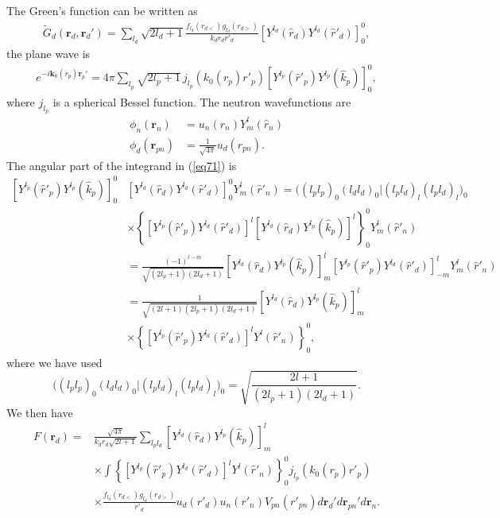\documentclass[a4paper,11pt]{article}
\begin{document}
The Green's function can be written as
\begin{align}\label{eq44}
\widetilde G_d(\mathbf r_d,\mathbf r_d')=\sum_{l_d}\sqrt{2l_d+1}\frac{f_{l_d}(r_{d<})g_{l_d}(r_{d>})}{k_dr_dr'_d}\left[Y^{l_d}(\hat r_d) Y^{l_d}(\hat r'_d)\right]^0_0,
\end{align}
the plane wave is
\begin{align}\label{eq45}
e^{-i\mathbf k_0(r_p)\mathbf r_p'}=4\pi\sum_{l_p}\sqrt{2l_p+1}\,j_{l_p}(k_0(r_p) r'_p)\left[Y^{l_p}(\hat r'_p) Y^{l_p}(\hat k_p)\right]^0_0,
\end{align}
where $j_{l_p}$ is a spherical Bessel function.  The neutron wavefunctions are
\begin{align}\label{eq38}
\nonumber \phi_n(\mathbf{r}_n)&=u_n(r_n)Y^{l}_{m}(\hat r_n)\\
\phi_d(\mathbf{r}_{pn})&=\frac{1}{\sqrt{4\pi}}u_d(r_{pn}).
\end{align}
The angular part of the integrand in (\ref{eq71}) is
\begin{align}\label{eq46}
\nonumber\left[Y^{l_p}(\hat r'_p) Y^{l_p}(\hat k_p)\right]^0_0&\left[Y^{l_d}(\hat r_d) Y^{l_d}(\hat r'_d)\right]^0_0Y_m^l(\hat r'_n)=\bigl((l_p l_p)_0(l_d l_d)_0|(l_p l_d)_l(l_p l_d)_{l}\bigr)_0\\
\nonumber&\times \left\{\left[Y^{l_p}(\hat r'_p) Y^{l_d}(\hat r'_d)\right]^l\left[Y^{l_d}(\hat r_d) Y^{l_p}(\hat k_p)\right]^l\right\}^0_0Y_m^l(\hat r'_n)\\
\nonumber&=\frac{(-1)^{l-m}}{\sqrt{(2l_p+1)(2l_d+1)}}\left[Y^{l_d}(\hat r_d) Y^{l_p}(\hat k_p)\right]^l_m\left[Y^{l_p}(\hat r'_p) Y^{l_d}(\hat r'_d)\right]^l_{-m}Y_m^l(\hat r'_n)\\
\nonumber &=\frac{1}{\sqrt{(2l+1)(2l_p+1)(2l_d+1)}}\left[Y^{l_d}(\hat r_d) Y^{l_p}(\hat k_p)\right]^l_m\\
&\times\left\{\left[Y^{l_p}(\hat r'_p) Y^{l_d}(\hat r'_d)\right]^lY^l(\hat r'_n)\right\}^0_0,
\end{align}
where we have used
\begin{equation}\label{eq61}
\bigl((l_p l_p)_0(l_d l_d)_0|(l_p l_d)_l(l_p l_d)_{l}\bigr)_0=\sqrt{\frac{2l+1}{(2l_p+1)(2l_d+1)}}.
\end{equation}
We then have 
 \begin{align}\label{eq47}
\nonumber F(\mathbf r_d)=&\frac{\sqrt{4\pi}}{k_dr_d\sqrt{2l+1}}\sum_{l_pl_d} \left[Y^{l_d}(\hat r_d) Y^{l_p}(\hat k_p)\right]^l_m\\
\nonumber&\times\int \left\{\left[Y^{l_p}(\hat r'_p) Y^{l_d}(\hat r'_d)\right]^lY^l(\hat r'_n)\right\}^0_0j_{l_p}(k_0(r_p) r'_p)\\
&\times \frac{f_{l_d}(r_{d<})g_{l_d}(r_{d>})}{r'_d}  u_d(r'_d)u_n(r'_n)V_{pn}(r'_{pn}) d\mathbf r_d' d\mathbf r_{pn}'d\mathbf r_n.
 \end{align}
\end{document}
